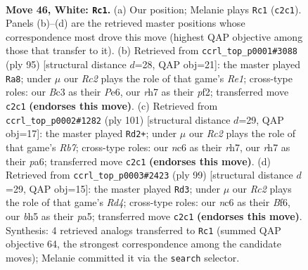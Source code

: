 \documentclass[11pt]{article}
\begin{document}
\clearpage

\begin{figure}[p]\centering
\begin{subfigure}{0.46\textwidth}\centering
\resizebox{\linewidth}{!}{%
\newchessgame
\chessboard[
  setfen={6k1/7r/p1n5/5P1b/1P6/2B5/P1R3K1/8 w - - 3 46},
  showmover=false,
  pgfstyle=straightmove, color=movearrow, markmove={c2-c1}
]}
\caption{}
\end{subfigure}\hfill
\begin{subfigure}{0.46\textwidth}\centering
\resizebox{\linewidth}{!}{%
\newchessgame
\chessboard[
  setfen={4r1k1/6p1/4p3/3p2p1/PN6/8/5PK1/7R b - - 0 48},
  showmover=false,
  pgfstyle=straightmove, color=movearrow, markmove={e8-a8}
]}
\caption{}
\end{subfigure}
\\[4pt]
\begin{subfigure}{0.46\textwidth}\centering
\resizebox{\linewidth}{!}{%
\newchessgame
\chessboard[
  setfen={1k6/7R/P7/N1PK2p1/7p/8/1r3b2/8 b - - 1 51},
  showmover=false,
  pgfstyle=straightmove, color=movearrow, markmove={b2-d2}
]}
\caption{}
\end{subfigure}\hfill
\begin{subfigure}{0.46\textwidth}\centering
\resizebox{\linewidth}{!}{%
\newchessgame
\chessboard[
  setfen={8/3k4/4pb2/Pp1r3p/8/1KP5/2R4B/8 b - - 2 50},
  showmover=false,
  pgfstyle=straightmove, color=movearrow, markmove={d5-d3}
]}
\caption{}
\end{subfigure}
\caption{\textbf{Move 46, White: \texttt{Rc1}.} (a) Our position; Melanie plays \texttt{Rc1} (\texttt{c2c1}). Panels (b)--(d) are the retrieved master positions whose correspondence most drove this move (highest QAP objective among those that transfer to it). (b) Retrieved from \texttt{ccrl\_top\_p0001\#3088} (ply 95) [structural distance $d$=28, QAP obj=21]: the master played \texttt{Ra8}; under $\mu$ our \emph{Rc2} plays the role of that game's \emph{Re1}; cross-type roles: our \emph{B}c3 as their \emph{P}e6, our \emph{r}h7 as their \emph{p}f2; transferred move \texttt{c2c1} \textbf{(endorses this move)}. (c) Retrieved from \texttt{ccrl\_top\_p0002\#1282} (ply 101) [structural distance $d$=29, QAP obj=17]: the master played \texttt{Rd2+}; under $\mu$ our \emph{Rc2} plays the role of that game's \emph{Rb7}; cross-type roles: our \emph{n}c6 as their \emph{r}h7, our \emph{r}h7 as their \emph{p}a6; transferred move \texttt{c2c1} \textbf{(endorses this move)}. (d) Retrieved from \texttt{ccrl\_top\_p0003\#2423} (ply 99) [structural distance $d$=29, QAP obj=15]: the master played \texttt{Rd3}; under $\mu$ our \emph{Rc2} plays the role of that game's \emph{Rd4}; cross-type roles: our \emph{n}c6 as their \emph{B}f6, our \emph{b}h5 as their \emph{p}a5; transferred move \texttt{c2c1} \textbf{(endorses this move)}. Synthesis: 4 retrieved analogs transferred to \texttt{Rc1} (summed QAP objective 64, the strongest correspondence among the candidate moves); Melanie committed it via the \texttt{search} selector.}
\label{fig:thought-m90}
\end{figure}
\end{document}
